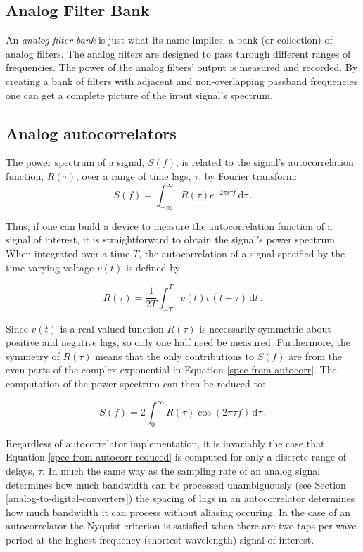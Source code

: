 \documentclass{ws-rv961x669}
\begin{document}
\subsection{Analog Filter Bank}\label{analog-filter-bank}

An \emph{analog filter bank} is just what its name implies: a bank (or collection) of analog filters. The analog filters are designed to pass through different ranges of frequencies. The power of the analog filters' output is measured and recorded. By creating a bank of filters with adjacent and non-overlapping passband frequencies one can get a complete picture of the input signal's spectrum.

\subsection{Analog autocorrelators}\label{autocorrelators}
The power spectrum of a signal, $S(f)$,  is related to the signal's autocorrelation function, $R(\tau)$, over a range of time lags, $\tau$, by Fourier transform:
\begin{equation}
\label{spec-from-autocorr}
 S(f) = \int_{-\infty}^{\infty} R(\tau)e^{-2\pi i \tau f} \,\mathrm{d}\tau \,.
\end{equation}

Thus, if one can build a device to measure the autocorrelation function of a signal of interest, it is straightforward to obtain the signal's power spectrum.
When integrated over a time $T$, the autocorrelation of a signal specified by the time-varying voltage $v(t)$ is defined by 

\begin{equation}
\label{autocorr}
 R(\tau) = \frac{1}{2T} \int_{-T}^{T} v(t)v(t+\tau) \,\mathrm{d}t \,.
\end{equation}

Since $v(t)$ is a real-valued function $R(\tau)$ is necessarily symmetric about positive and negative lags, so only one half need be measured. Furthermore, the symmetry of $R(\tau)$ means that the only contributions to $S(f)$ are from the even parts of the complex exponential in Equation \ref{spec-from-autocorr}. The computation of the power spectrum can then be reduced to:

\begin{equation}
\label{spec-from-autocorr-reduced}
 S(f) = 2\int_{0}^{\infty} R(\tau)\cos{(2\pi \tau f)} \,\mathrm{d}\tau \,.
\end{equation}

Regardless of autocorrelator implementation, it is invariably the case that Equation \ref{spec-from-autocorr-reduced} is computed for only a discrete range of delays, $\tau$. In much the same way as the sampling rate of an analog signal determines how much bandwidth can be processed unambiguously (see Section \ref{analog-to-digital-converters}) the spacing of lags in an autocorrelator determines how much bandwidth it can process without aliasing occuring. In the case of an autocorrelator the Nyquist criterion is satisfied when there are two taps per wave period at the highest frequency (shortest wavelength) signal of interest. 
\end{document}
